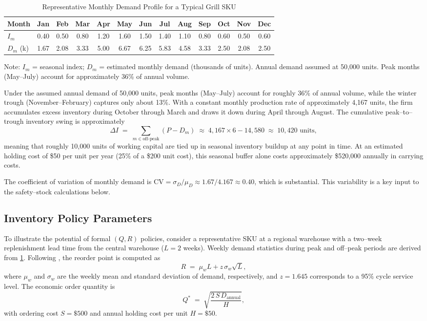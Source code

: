 \documentclass[12pt,a4paper]{article}
\begin{document}
\begin{table}[H]
  \centering
  \caption{Representative Monthly Demand Profile for a Typical Grill SKU}
  \label{tab:seasonal_demand}
  \small
  \begin{tabular}{lcccccccccccc}
    \toprule
    Month & Jan & Feb & Mar & Apr & May & Jun & Jul & Aug & Sep & Oct & Nov & Dec \\
    \midrule
    $I_m$       & 0.40 & 0.50 & 0.80 & 1.20 & 1.60 & 1.50 & 1.40 & 1.10 & 0.80 & 0.60 & 0.50 & 0.60 \\
    $D_m$ (k)   & 1.67 & 2.08 & 3.33 & 5.00 & 6.67 & 6.25 & 5.83 & 4.58 & 3.33 & 2.50 & 2.08 & 2.50 \\
    \bottomrule
  \end{tabular}

  \vspace{0.3em}
  \footnotesize{Note: $I_m$ = seasonal index; $D_m$ = estimated monthly demand (thousands of units). Annual demand assumed at 50{,}000 units. Peak months (May--July) account for approximately 36\% of annual volume.}
\end{table}

Under the assumed annual demand of 50{,}000 units, peak months (May--July) account for roughly 36\% of annual volume, while the winter trough (November--February) captures only about 13\%. With a constant monthly production rate of approximately 4{,}167 units, the firm accumulates excess inventory during October through March and draws it down during April through August. The cumulative peak--to--trough inventory swing is approximately
\[
  \Delta I \;=\; \sum_{m \in \text{off-peak}} (P - D_m) \;\approx\; 4{,}167 \times 6 - 14{,}580 \;\approx\; 10{,}420 \text{ units},
\]
meaning that roughly 10{,}000 units of working capital are tied up in seasonal inventory buildup at any point in time. At an estimated holding cost of \$50 per unit per year (25\% of a \$200 unit cost), this seasonal buffer alone costs approximately \$520{,}000 annually in carrying costs.

The coefficient of variation of monthly demand is $\text{CV} = \sigma_D / \mu_D \approx 1.67 / 4.167 \approx 0.40$, which is substantial. This variability is a key input to the safety--stock calculations below.

\subsection{Inventory Policy Parameters}

To illustrate the potential of formal $(Q, R)$ policies, consider a representative SKU at a regional warehouse with a two--week replenishment lead time from the central warehouse ($L = 2$ weeks). Weekly demand statistics during peak and off--peak periods are derived from \cref{tab:seasonal_demand}. Following \citet{silver1998inventory}, the reorder point is computed as
\[
R \;=\; \mu_{w} L + z\,\sigma_{w}\sqrt{L},
\]
where $\mu_w$ and $\sigma_w$ are the weekly mean and standard deviation of demand, respectively, and $z = 1.645$ corresponds to a 95\% cycle service level. The economic order quantity is
\[
Q^* \;=\; \sqrt{\frac{2\,S\,D_{\text{annual}}}{H}},
\]
with ordering cost $S = \$500$ and annual holding cost per unit $H = \$50$.
\end{document}
